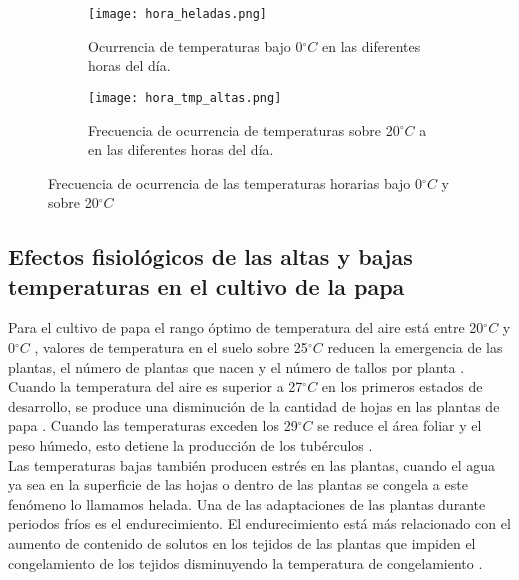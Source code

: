 \documentclass[11pt]{article}
\def\celc{$^{\circ}C$ }%
\begin{document}
\begin{figure}[H]
	\begin{subfigure}[b]{\linewidth}
	\begin{center}
	\texttt{[image: hora\_heladas.png]}
		
		\caption{Ocurrencia de temperaturas bajo 0\celc en las diferentes horas del día.}		
		\label{graph:tmp_bajo_hora}
		
	\end{center}
	\end{subfigure}
	
	\begin{subfigure}[b]{\linewidth}
	\begin{center}
	\texttt{[image: hora\_tmp\_altas.png]}
		
		\caption{Frecuencia de ocurrencia de temperaturas sobre 20\celc a en las diferentes horas del día.}		
		\label{graph:tmp_sobre_hora}
		
	\end{center}
	\end{subfigure}
	
	
	\caption{Frecuencia de ocurrencia de las temperaturas horarias bajo 0\celc y sobre 20\celc}		
	\label{graph:tmp_hora}

\end{figure}

\subsection{Efectos fisiológicos de las altas y bajas temperaturas en el cultivo de la papa}

Para el cultivo de papa el rango óptimo de temperatura del aire está entre 20\celc y 0\celc \citep{Hijmans2003}, valores de temperatura en el suelo sobre 25\celc reducen la emergencia de las plantas, el número de plantas que nacen y el número de tallos por planta \citep{birch2012crops, sale1979growth}. Cuando la temperatura del aire es superior a 27\celc en los primeros estados de desarrollo, se produce una disminución de la cantidad de hojas en las plantas de papa \citep{birch2012crops, sale1979growth}. Cuando las temperaturas exceden los 29\celc se reduce el área foliar y el peso húmedo, esto detiene la producción de los tubérculos \citep{prange1990reduction}.\\

Las temperaturas bajas también producen estrés en las plantas, cuando el agua ya sea en la superficie de las hojas o dentro de las plantas se congela a este fenómeno lo llamamos helada. Una de las adaptaciones de las plantas durante periodos fríos es el endurecimiento. El endurecimiento está más relacionado con el aumento de contenido de solutos en los tejidos de las plantas que impiden el congelamiento de los tejidos disminuyendo la temperatura de congelamiento \citep{Snyder2010}.\\
\end{document}
